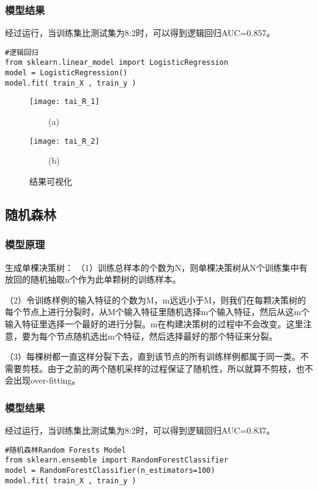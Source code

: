 \documentclass[withoutpreface,bwprint]{cumcmthesis} %
\begin{document}
\subsubsection{模型结果}
\par 经过运行，当训练集比测试集为8:2时，可以得到逻辑回归AUC=0.857。
\begin{lstlisting}
#逻辑回归
from sklearn.linear_model import LogisticRegression
model = LogisticRegression()
model.fit( train_X , train_y )
\end{lstlisting}

\begin{figure}[H]
	\centering
	\begin{minipage}[t]{0.48\textwidth}
		\centering
		\texttt{[image: tai\_R\_1]}
		\centerline{$\ \ \ \ \ \ \ \ \ \ $(a)}
	\end{minipage}
	\begin{minipage}[t]{0.48\textwidth}
		\centering
		\texttt{[image: tai\_R\_2]}
		\centerline{$\ \ \ \ \ \ \ \ \ \ $(b)}
	\end{minipage}
	
	\caption{结果可视化}
\end{figure}

\subsection{随机森林}
\subsubsection{模型原理}
\par  生成单棵决策树：
（1）训练总样本的个数为N，则单棵决策树从N个训练集中有放回的随机抽取n个作为此单颗树的训练样本。

（2）令训练样例的输入特征的个数为M，m远远小于M，则我们在每颗决策树的每个节点上进行分裂时，从M个输入特征里随机选择m个输入特征，然后从这m个输入特征里选择一个最好的进行分裂。m在构建决策树的过程中不会改变。这里注意，要为每个节点随机选出m个特征，然后选择最好的那个特征来分裂。

（3）每棵树都一直这样分裂下去，直到该节点的所有训练样例都属于同一类。不需要剪枝。由于之前的两个随机采样的过程保证了随机性，所以就算不剪枝，也不会出现over-fitting。


\subsubsection{模型结果}
\par 经过运行，当训练集比测试集为8:2时，可以得到逻辑回归AUC=0.837。
\begin{lstlisting}
#随机森林Random Forests Model
from sklearn.ensemble import RandomForestClassifier
model = RandomForestClassifier(n_estimators=100)
model.fit( train_X , train_y )

\end{lstlisting}
\end{document}
